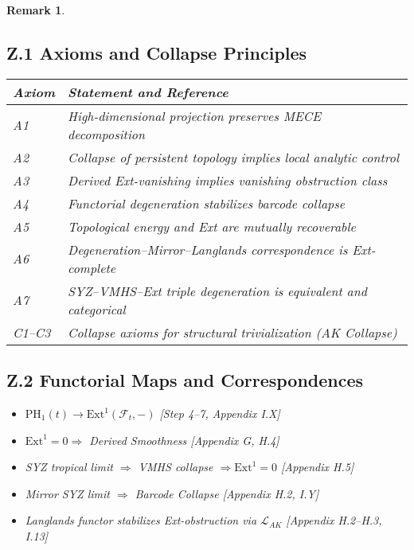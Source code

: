 \documentclass[11pt]{article}
\newtheorem{remark}[theorem]{Remark}
\begin{document}
\begin{remark}
\subsection*{Z.1 Axioms and Collapse Principles}
\begin{tabular}{ll}
\textbf{Axiom} & \textbf{Statement and Reference} \\
\hline
A1 & High-dimensional projection preserves MECE decomposition \quad [Sec. 2.1] \\
A2 & Collapse of persistent topology implies local analytic control \quad [Step 1–3] \\
A3 & Derived Ext-vanishing implies vanishing obstruction class \quad [Appendix G] \\
A4 & Functorial degeneration stabilizes barcode collapse \quad [Appendix H.2] \\
A5 & Topological energy and Ext are mutually recoverable \quad [Appendix C, I.X] \\
A6 & Degeneration–Mirror–Langlands correspondence is Ext-complete \quad [Appendix I.13] \\
A7 & SYZ–VMHS–Ext triple degeneration is equivalent and categorical \quad [Appendix H.5] \\
C1–C3 & Collapse axioms for structural trivialization (AK Collapse) \quad [Appendix J] \\
\end{tabular}

\vspace{1em}

\subsection*{Z.2 Functorial Maps and Correspondences}
\begin{itemize}
  \item $\mathrm{PH}_1(t) \longrightarrow \mathrm{Ext}^1(\mathcal{F}_t, -)$  
  \hfill [Step 4–7, Appendix I.X]
  
  \item $\mathrm{Ext}^1 = 0 \Rightarrow$ Derived Smoothness  
  \hfill [Appendix G, H.4]
  
  \item SYZ tropical limit $\Rightarrow$ VMHS collapse $\Rightarrow \mathrm{Ext}^1 = 0$  
  \hfill [Appendix H.5]
  
  \item Mirror SYZ limit $\Rightarrow$ Barcode Collapse  
  \hfill [Appendix H.2, I.Y]
  
  \item Langlands functor stabilizes Ext-obstruction via $\mathcal{L}_{AK}$  
  \hfill [Appendix H.2–H.3, I.13]
  

\end{itemize}
\end{remark}
\end{document}
